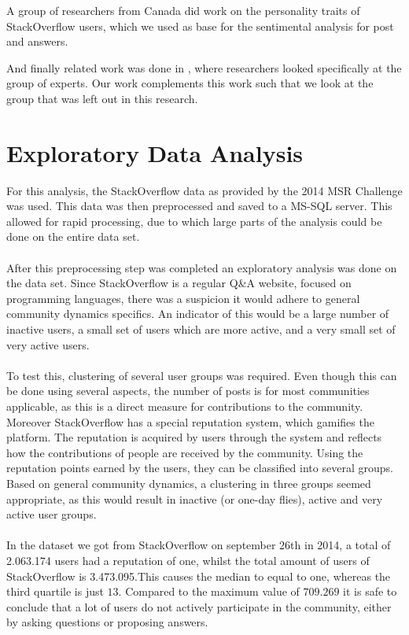 \documentclass[conference]{IEEEtran}
\begin{document}
A group of researchers from Canada \cite{bazelli2013personality} did work on the personality traits of StackOverflow users, which we used as base for the sentimental analysis for post and answers.

And finally related work was done in \cite{yang2014sparrows}, where researchers looked specifically at the group of experts. Our work complements this work such that we look at the group that was left out in this research.
\\



\section{Exploratory Data Analysis}

For this analysis, the StackOverflow data as provided by the 2014 MSR Challenge was used. This data was then preprocessed and saved to a MS-SQL server. This allowed for rapid processing, due to which large parts of the analysis could be done on the entire data set.
\\
\\
After this preprocessing step was completed an exploratory analysis was done on the data set. Since StackOverflow is a regular Q\&A website, focused on programming languages, there was a suspicion it would adhere to general community dynamics specifics. An indicator of this would be a large number of inactive users, a small set of users which are more active, and a very small set of very active users.
\\
\\
To test this, clustering of several user groups was required. Even though  this can be done using several aspects, the number of posts is for most communities applicable, as this is a direct measure for contributions to the community. Moreover StackOverflow has a special reputation system, which gamifies the platform. The reputation is acquired by users through the system and reflects how the contributions of people are received by the community. Using the reputation points earned by the users, they can be classified into several groups. Based  on general community dynamics, a clustering in three groups seemed appropriate, as this would result in inactive (or one-day flies), active and very active user groups.
\\
\\
In the dataset we got from StackOverflow on september 26th in 2014, a total of 2.063.174 users had a reputation of one, whilst the total amount of users of StackOverflow is 3.473.095.This causes the median to  equal to one, whereas the third quartile is just $13$. Compared to the maximum value of $709.269$ it is safe to conclude that a lot of users do not actively participate in the community, either by asking questions or proposing answers.
\end{document}

